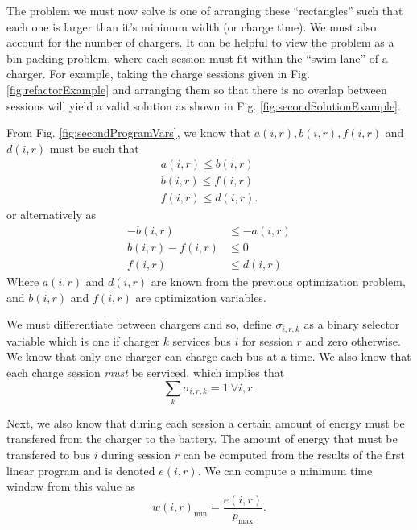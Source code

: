 \par The problem we must now solve is one of arranging these ``rectangles'' such that each one is larger than it's minimum width (or charge time).  We must also account for the number of chargers. It can be helpful to view the problem as a bin packing problem, where each session must fit within the ``swim lane'' of a charger.  For example, taking the charge sessions given in Fig. \ref{fig:refactorExample} and arranging them so that there is no overlap between sessions will yield a valid solution as shown in Fig. \ref{fig:secondSolutionExample}.
\par From Fig. \ref{fig:secondProgramVars}, we know that $a(i,r), b(i,r),f(i,r)$ and $d(i,r)$ must be such that 
\begin{equation*}\begin{aligned}
	a(i,r) \le b(i,r) \\
	b(i,r) \le f(i,r) \\
	f(i,r) \le d(i,r). 	
\end{aligned}\end{equation*}
or alternatively as
\begin{equation} \begin{aligned}
	-b(i,r) &\le -a(i,r) \\
	b(i,r) - f(i,r) &\le 0 \\
	f(i,r) &\le d(i,r)
\end{aligned} \end{equation}
Where $a(i,r)$ and $d(i,r)$ are known from the previous optimization problem, and $b(i,r)$ and $f(i,r)$ are optimization variables. 
\par We must differentiate between chargers and so, define $\sigma_{i,r,k}$ as a binary selector variable which is one if charger $k$ services bus $i$ for session $r$ and zero otherwise. We know that only one charger can charge each bus at a time. We also know that each charge session {\it must} be serviced, which implies that
\begin{equation}
	\sum_k \sigma_{i,r,k} = 1  \ \forall i,r.
\end{equation}
\par Next, we also know that during each session a certain amount of energy must be transfered from the charger to the battery.  The amount of energy that must be transfered to bus $i$ during session $r$ can be computed from the results of the first linear program and is denoted $e(i,r)$. We can compute a minimum time window from this value as 
\begin{equation*}
	w(i,r)_{\text{min}} = \frac{e(i,r)}{p_\text{max}}.
\end{equation*}
